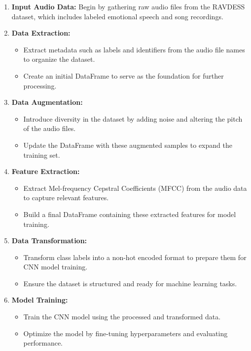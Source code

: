 \begin{enumerate}
    \item \textbf{Input Audio Data:} Begin by gathering raw audio files from the RAVDESS dataset, which includes labeled emotional speech and song recordings.
    \item \textbf{Data Extraction:}
    \begin{itemize}
        \item Extract metadata such as labels and identifiers from the audio file names to organize the dataset.
        \item Create an initial DataFrame to serve as the foundation for further processing.
    \end{itemize}
    \item \textbf{Data Augmentation:}
    \begin{itemize}
        \item Introduce diversity in the dataset by adding noise and altering the pitch of the audio files.
        \item Update the DataFrame with these augmented samples to expand the training set.
    \end{itemize}
    \item \textbf{Feature Extraction:}
    \begin{itemize}
        \item Extract Mel-frequency Cepstral Coefficients (MFCC) from the audio data to capture relevant features.
        \item Build a final DataFrame containing these extracted features for model training.
    \end{itemize}
    \item \textbf{Data Transformation:}
    \begin{itemize}
        \item Transform class labels into a non-hot encoded format to prepare them for CNN model training.
        \item Ensure the dataset is structured and ready for machine learning tasks.
    \end{itemize}
    \item \textbf{Model Training:}
    \begin{itemize}
        \item Train the CNN model using the processed and transformed data.
        \item Optimize the model by fine-tuning hyperparameters and evaluating performance.
    \end{itemize}
\end{enumerate}

